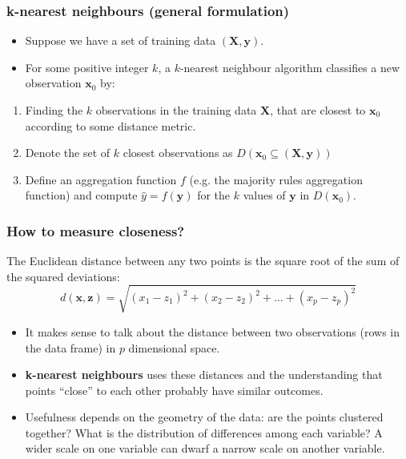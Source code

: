 \documentclass[a4paper]{article}\usepackage[]{graphicx}\usepackage[]{xcolor}
\begin{document}
\subsubsection{k-nearest neighbours (general formulation)}
\begin{itemize}
	\item Suppose we have a set of training data \( (\symbf{X}, \symbf{y}) \).
	\item For some positive integer \( k \), a \( k \)-nearest neighbour algorithm classifies a new observation \( \symbf{x}_0 \) by:
\end{itemize}	
\begin{enumerate}
	\item Finding the \( k \) observations in the training data \( \symbf{X} \), that are closest to \( \symbf{x}_0 \) according to some distance metric.
	\item Denote the set of \( k \) closest observations as \( D(\symbf{x}_0 \subseteq (\symbf{X}, \symbf{y})) \) 
	\item Define an aggregation function \( f \) (e.g. the majority rules aggregation function) and compute \( \hat{y} = f(\symbf{y}) \) for the \( k \) values of \( \symbf{y} \) in \( D(\symbf{x}_0) \).
\end{enumerate}
\subsubsection{How to measure closeness?}
The Euclidean distance between any two points is the square root of the sum of the squared deviations:
\[
	d(\symbf{x},\symbf{z}) = \sqrt{(x_{1} - z_{1})^2 + (x_{2} - z_{2})^2 + \ldots + (x_{p} - z_{p})^2}
\]
\begin{itemize}
	\item It makes sense to talk about the \textcolor{mygreen}{distance} between two observations (rows in the data frame) in \( p \) dimensional space.
	\item \textcolor{myblue}{\textbf{k-nearest neighbours}} uses these distances and the understanding that points ``close'' to each other probably have similar outcomes.
	\item Usefulness depends on the geometry of the data: are the points clustered together? What is the distribution of differences among each variable? A wider scale on one variable can dwarf a narrow scale on another variable.
\end{itemize}
\end{document}
